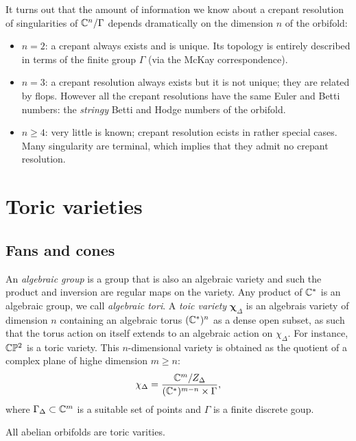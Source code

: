         It turns out that the amount of information we know about a crepant resolution of singularities of $\mathbb{C}^n/\Gamma$ depends dramatically on the dimension $n$ of the orbifold:
        \begin{itemize}
            \item $n=2$: a crepant always exists and is unique. Its topology is entirely described in terms of the finite group $\Gamma$ (via the McKay correspondence).
            \item $n=3$: a crepant resolution always exists but it is not unique; they are related by flops. However all the crepant resolutions have the same Euler and Betti numbers: the \emph{stringy} Betti and Hodge numbers of the orbifold.
            \item $n\geq4$: very little is known; crepant resolution ecists in rather special cases. Many singularity are terminal, which implies that they admit no crepant resolution.
        \end{itemize}


\section{Toric varieties}

    \subsection{Fans and cones}

        An \emph{algebraic group} is a group that is also an algebraic variety and such the product and inversion are regular maps on the variety. Any product of $\mathbb{C}^*$ is an algebraic group, we call \emph{algebraic tori}. A \emph{toic variety} $\boldsymbol{\chi}_\Delta$ is an algebrais variety of dimension $n$ containing an algebraic torus $(\mathbb{C}^*)^n$ as a dense open subset, as such that the torus action on itself extends to an algebraic action on $\chi_\Delta$. For instance, $\mathbb{C}\mathbb{P}^2$ is a toric variety. This $n$-dimensional variety is obtained as the quotient of a complex plane of highe dimension $m\geq n$:
        \begin{equation}
            \chi_\Delta=\frac{\mathbb{C}^m/Z_\Delta}{(\mathbb{C}^*)^{m-n}\times\Gamma},
        \end{equation}
        where $\Gamma_\Delta\subset\mathbb{C}^m$ is a suitable set of points  and $\Gamma$ is a finite discrete goup.

        \begin{prop*}
            All abelian orbifolds are toric varities.
        \end{prop*}

